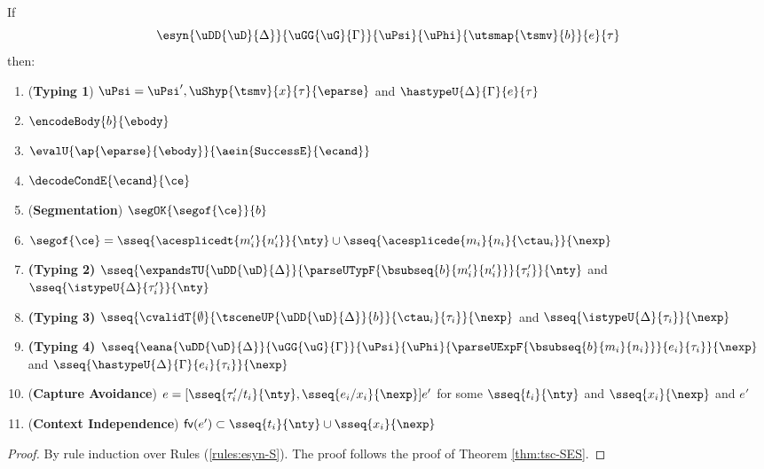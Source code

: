 \begin{theorem}
\label{thm:tsc-implicit-B}
If \[\esyn{\uDD{\uD}{\Delta}}{\uGG{\uG}{\Gamma}}{\uPsi}{\uPhi}{\utsmap{\tsmv}{b}}{e}{\tau}\] then:
\begin{enumerate}
\item (\textbf{Typing 1}) $\uPsi = \uPsi', \uShyp{\tsmv}{x}{\tau}{\eparse}$ and $\hastypeU{\Delta}{\Gamma}{e}{\tau}$
\item $\encodeBody{b}{\ebody}$
\item $\evalU{\ap{\eparse}{\ebody}}{\aein{\mathtt{SuccessE}}{\ecand}}$
\item $\decodeCondE{\ecand}{\ce}$
\item (\textbf{Segmentation}) $\segOK{\segof{\ce}}{b}$
\item $\segof{\ce} = \sseq{\acesplicedt{m'_i}{n'_i}}{\nty} \cup \sseq{\acesplicede{m_i}{n_i}{\ctau_i}}{\nexp}$
\item \textbf{(Typing 2)} $\sseq{
      \expandsTU{\uDD{\uD}{\Delta}}
      {
        \parseUTypF{\bsubseq{b}{m'_i}{n'_i}}
      }{\tau'_i}
    }{\nty}$ and $\sseq{\istypeU{\Delta}{\tau'_i}}{\nty}$
\item \textbf{(Typing 3)} $\sseq{
  \cvalidT{\emptyset}{
    \tsceneUP
      {\uDD
        {\uD}{\Delta}
      }{b}
  }{
    \ctau_i
  }{\tau_i}
}{\nexp}$ and $\sseq{\istypeU{\Delta}{\tau_i}}{\nexp}$
\item \textbf{(Typing 4)} $\sseq{
  \eana
    {\uDD{\uD}{\Delta}}
    {\uGG{\uG}{\Gamma}}
    {\uPsi}
    {\uPhi}
    {\parseUExpF{\bsubseq{b}{m_i}{n_i}}}
    {e_i}
    {\tau_i}
}{\nexp}$ and $\sseq{\hastypeU{\Delta}{\Gamma}{e_i}{\tau_i}}{\nexp}$
\item (\textbf{Capture Avoidance}) $e = [\sseq{\tau'_i/t_i}{\nty}, \sseq{e_i/x_i}{\nexp}]e'$ for some $\sseq{t_i}{\nty}$ and $\sseq{x_i}{\nexp}$ and $e'$
\item (\textbf{Context Independence}) $\mathsf{fv}(e') \subset \sseq{t_i}{\nty} \cup \sseq{x_i}{\nexp}$
\end{enumerate}
\end{theorem}
\begin{proof} By rule induction over Rules (\ref{rules:esyn-S}). The proof follows the proof of Theorem \ref{thm:tsc-SES}.
\end{proof}

